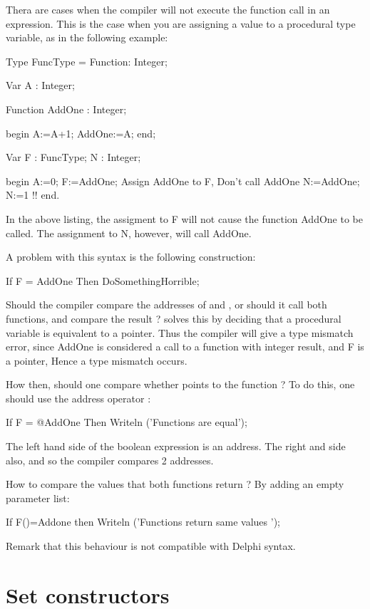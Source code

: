 \documentclass{report}
\begin{document}
Thera are cases when the compiler will not execute the function call in an
expression. This is the case when you are assigning a value to a procedural
type variable, as in the following example:
\begin{listing}
Type 
  FuncType = Function: Integer;

Var A : Integer;

Function AddOne : Integer;

begin
  A:=A+1;
  AddOne:=A;
end;

Var F : FuncType;
    N : Integer;

begin
  A:=0;
  F:=AddOne; { Assign AddOne to F, Don't call AddOne}
  N:=AddOne; { N:=1 !!}
end.
\end{listing}
In the above listing, the assigment to F will not cause the function AddOne
to be called. The assignment to N, however, will call AddOne.

A problem with this syntax is the following construction:
\begin{listing}
If F = AddOne Then
  DoSomethingHorrible;
\end{listing}
Should the compiler compare the addresses of  and ,
or should it call both functions, and compare the result ? \fpc solves this
by deciding that a procedural variable is equivalent to a pointer. Thus the
compiler will give a type mismatch error, since AddOne is considered a
call to a function with integer result, and F is a pointer, Hence a type
mismatch occurs.

How then, should one compare whether  points to the function
 ? To do this, one should use the address operator :
\begin{listing}
If F = @AddOne Then
  Writeln ('Functions are equal');
\end{listing}
The left hand side of the boolean expression is an address. The right and
side also, and so the compiler compares 2 addresses.

How to compare the values that both functions return ? By adding an empty
parameter list:
\begin{listing}
  If F()=Addone then
    Writeln ('Functions return same values ');
\end{listing}

Remark that this behaviour is not compatible with Delphi syntax.

\section{Set constructors}
\end{document}
